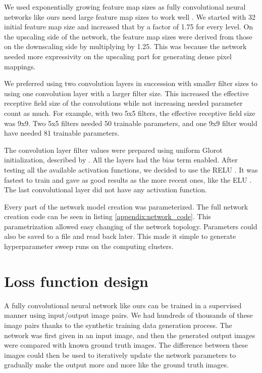 We used exponentially growing feature map sizes as fully convolutional neural networks like ours need large feature map sizes to work well \cite{Ronneberger2015}. We started with 32 initial feature map size and increased that by a factor of 1.75 for every level. On the upscaling side of the network, the feature map sizes were derived from those on the downscaling side by multiplying by 1.25. This was because the network needed more expressivity on the upscaling part for generating dense pixel mappings.

We preferred using two convolution layers in succession with smaller filter sizes to using one convolution layer with a larger filter size. This increased the effective receptive field size of the convolutions while not increasing needed parameter count as much. For example, with two 5x5 filters, the effective receptive field size was 9x9. Two 5x5 filters needed 50 trainable parameters, and one 9x9 filter would have needed 81 trainable parameters.

The convolution layer filter values were prepared using uniform Glorot initialization, described by \textcite{Glorot2010}. All the layers had the bias term enabled. After testing all the available activation functions, we decided to use the \ac{RELU} \cite{Goodfellow2016}. It was fastest to train and gave as good results as the more recent ones, like the \ac{ELU} \cite{Clevert2015}. The last convolutional layer did not have any activation function.

Every part of the network model creation was parameterized. The full network creation code can be seen in listing \ref{appendix:network_code}. This parametrization allowed easy changing of the network topology. Parameters could also be saved to a file and read back later. This made it simple to generate hyperparameter sweep runs on the computing clusters.

\section{Loss function design}
\label{sec:loss_func}

A fully convolutional neural network like ours can be trained in a supervised manner using input/output image pairs. We had hundreds of thousands of these image pairs thanks to the synthetic training data generation process. The network was first given in an input image, and then the generated output images were compared with known ground truth images. The difference between these images could then be used to iteratively update the network parameters to gradually make the output more and more like the ground truth images.

